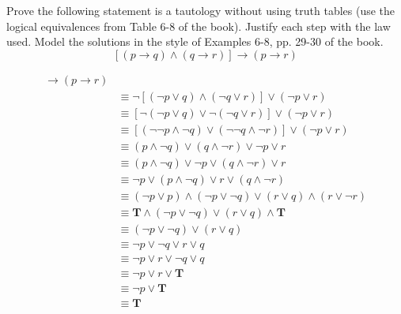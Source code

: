 \begin{questions}
\newpage
{} Prove the following statement is a tautology without using truth tables (use the logical equivalences from Table 6-8 of the book).  Justify each step with the law used.  Model the solutions in the style of Examples 6-8, pp. 29-30 of the book.
\[ [(p \rightarrow q) \wedge (q \rightarrow r)] \rightarrow (p \rightarrow r) \]
    \ifprintanswers
        \vspace{-30pt}
    \fi
	\begin{solution}
   \begin{align*}
    [(p \rightarrow q) &\wedge (q \rightarrow r)] \rightarrow (p \rightarrow r) \\
     & \equiv \neg [ (\neg p \vee q) \wedge (\neg q \vee r)] \vee (\neg p \vee r) \tag{Table 7, rule 1, x4}\\
     & \equiv [\neg (\neg p \vee q) \vee \neg (\neg q \vee r)] \vee (\neg p \vee r) \tag{DeMorgan's} \\
     & \equiv [(\neg \neg p \wedge \neg q) \vee (\neg \neg q \wedge \neg r)] \vee (\neg p \vee r) \tag{DeMorgan's, x2} \\
     & \equiv (p \wedge \neg q) \vee (q \wedge \neg r) \vee \neg p \vee r \tag{Double Negation, x2} \\
     & \equiv (p \wedge \neg q) \vee \neg p \vee (q \wedge \neg r) \vee r \tag{Commutative} \\
     & \equiv \neg p \vee (p \wedge \neg q) \vee r \vee (q \wedge \neg r) \tag{Commutative, x2} \\
     & \equiv (\neg p \vee p) \wedge (\neg p \vee \neg q) \vee (r \vee q) \wedge (r \vee \neg r) \tag{Distributive, x2} \\
     & \equiv \mathbf{T} \wedge (\neg p \vee \neg q) \vee (r \vee q) \wedge \mathbf{T} \tag{Negation, x2} \\
     & \equiv (\neg p \vee \neg q) \vee (r \vee q) \tag{Identity, x2} \\
     & \equiv \neg p \vee \neg q \vee r \vee q \tag{algebra} \\
     & \equiv \neg p \vee r \vee \neg q \vee q \tag{Commutative} \\
     & \equiv \neg p \vee r \vee \mathbf{T} \tag{Negation} \\
     & \equiv \neg p \vee \mathbf{T} \tag{Domination} \\
     & \equiv \mathbf{T} \tag{Domination}
  \end{align*}



\end{solution}
\end{questions}
